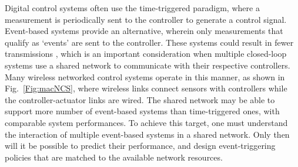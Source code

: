 \documentclass[journal]{IEEEtran}
\begin{document}
Digital control systems often use the time-triggered paradigm, where a measurement is periodically sent to the controller to generate a control signal. Event-based systems provide an alternative, wherein only measurements that qualify as `events' are sent to the controller. These systems could result in fewer transmissions \cite{Astrom1999,Otanez2002}, which is an important consideration when multiple closed-loop systems use a shared network to communicate with their respective controllers. Many wireless networked control systems operate in this manner, as shown in Fig.~\ref{Fig:macNCS}, where wireless links connect sensors with controllers while the controller-actuator links are wired. The shared network may be able to support more number of event-based systems than time-triggered ones, with comparable system performances. To achieve this target, one must understand the interaction of multiple event-based systems in a shared network. Only then will it be possible to predict their performance, and design event-triggering policies that are matched to the available network resources. 
\end{document}
